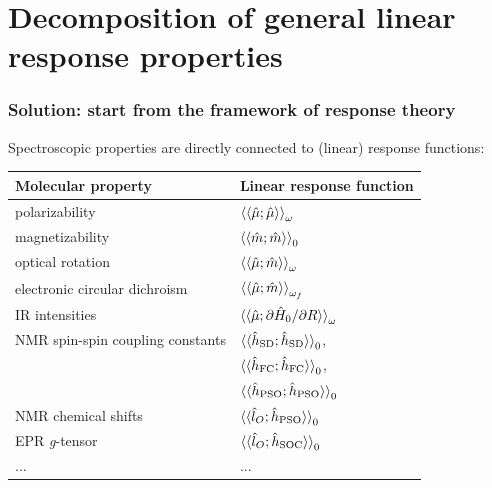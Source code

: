 \documentclass[%
    xcolor=usenames,dvipsnames,svgnames%
]{beamer}
\begin{document}
\section{Decomposition of general linear response properties}

\begin{frame}
  \frametitle{Solution: start from the framework of response theory}
  Spectroscopic properties are directly connected to (linear) response functions:
  \begin{table}
    \centering
    \begin{tabular}{ll}
      \toprule
      \textbf{Molecular property}       & \textbf{Linear response function} \\
      \midrule
      polarizability                    & \( \braket{\braket{\hat{\mu};\hat{\mu}}}_{\omega} \) \\
      magnetizability                   & \( \braket{\braket{\hat{m};\hat{m}}}_{0} \) \\
      optical rotation                  & \( \braket{\braket{\hat{\mu};\hat{m}}}_{\omega} \) \\
      electronic circular dichroism     & \( \braket{\braket{\hat{\mu};\hat{m}}}_{\omega_{f}} \) \\
      IR intensities                    & \( \braket{\braket{\hat{\mu};\partial\hat{H}_{0}/\partial R}}_{\omega} \) \\
      NMR spin-spin coupling constants  & \( \braket{\braket{\hat{h}_{\text{SD}};\hat{h}_{\text{SD}}}}_{0} \), \\
                                        & \( \braket{\braket{\hat{h}_{\text{FC}};\hat{h}_{\text{FC}}}}_{0} \), \\
                                        & \( \braket{\braket{\hat{h}_{\text{PSO}};\hat{h}_{\text{PSO}}}}_{0} \) \\
      NMR chemical shifts               & \( \braket{\braket{\hat{l}_{O};\hat{h}_{\text{PSO}}}}_{0} \) \\
      EPR \textit{g}-tensor             & \( \braket{\braket{\hat{l}_{O};\hat{h}_{\text{SOC}}}}_{0} \) \\
      ... & ... \\
      \bottomrule
    \end{tabular}
  \end{table}
\end{frame}
\end{document}
